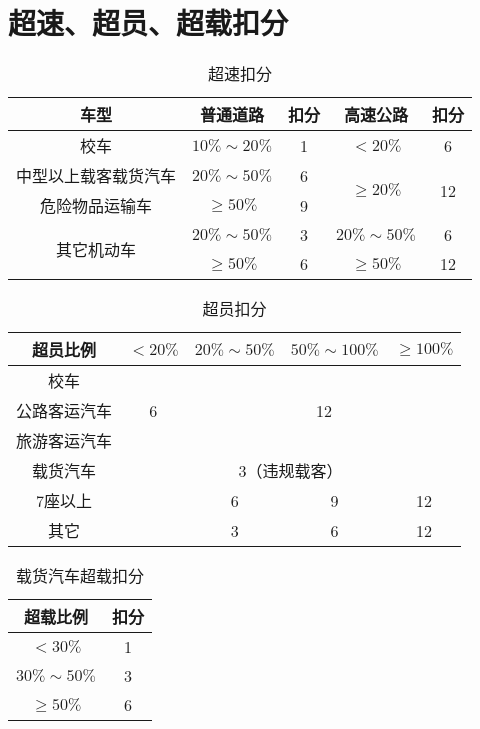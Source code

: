 \section{超速、超员、超载扣分}

\begin{table}[htbp]
\centering
\caption{超速扣分}
    \begin{tabular}{|c|c|c|c|c|}
        \hline
        \textbf{车型}  & \textbf{普通道路}  & \textbf{扣分}  & \textbf{高速公路}  & \textbf{扣分} \\
        \hline
        校车 & $10\% \sim 20\% $ & 1 & $< 20\%$ & 6 \\
        \cline{2-5}
        中型以上载客载货汽车 & $20\% \sim 50\%$ & 6 & \multirow{2}{*}{$\ge 20\%$} & \multirow{2}{*}{12} \\
        \cline{2-3}
        危险物品运输车 & $\ge 50\%$ & 9 & & \\
        \hline
        \multirow{2}{*}{其它机动车 } & $20\% \sim 50\%$ & 3 & $20\% \sim 50\%$ & 6\\
        \cline{2-5}
         & $\ge 50\%$ & 6 & $\ge 50\%$ & 12 \\
        \hline
    \end{tabular}
    \label{tab:speeding}
\end{table}
\begin{table}[htbp]
\centering
\caption{超员扣分}
    \begin{tabular}{|c|c|c|c|c|}
        \hline
        \textbf{超员比例}  & \textbf{$< 20\%$} & \textbf{$20\% \sim 50\%$} & \textbf{$50\% \sim 100\%$} & \textbf{$\ge 100\%$}\\
        \hline
         校车 & \multirow{3}{*}{6} & \multicolumn{3}{c|}{} \\
        \cline{1-1}
        公路客运汽车 & & \multicolumn{3}{c|}{12}  \\
        \cline{1-1}
        旅游客运汽车 & & \multicolumn{3}{c|}{} \\
        \hline
        载货汽车 & \multicolumn{4}{c|}{3（违规载客）} \\
        \hline
        7座以上 & & 6 & 9 & 12 \\
        \cline{1-1} \cline{3-5}
        其它 & & 3 & 6 & 12 \\
        \hline
    \end{tabular}
    \label{tab:overcrowding}
\end{table}

\begin{table}[htbp]
\centering
\caption{载货汽车超载扣分}
    \begin{tabular}{|c|c|}
        \hline
        \textbf{超载比例}  & \textbf{扣分} \\
        \hline
        $< 30\%$ & 1 \\
        \hline
        $30\% \sim 50\%$ & 3 \\
        \hline
        $\ge 50\%$ & 6 \\
        \hline
    \end{tabular}
    \label{tab:overloading}
\end{table}

